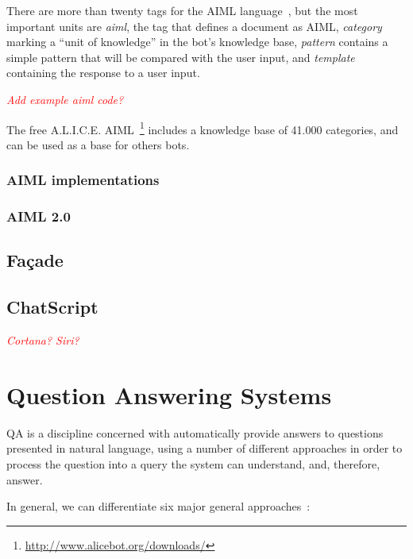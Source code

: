 There are more than twenty tags for the AIML language~\cite{aliceaiml}, but the most important units are \emph{aiml}, the tag that defines a document as \ac{AIML}, \emph{category} marking a ``unit of knowledge'' in the bot's knowledge base, \emph{pattern} contains a simple pattern that will be compared with the user input, and \emph{template} containing the response to a user input.

\emph{\textcolor{red}{Add example aiml code?}}

The free A.L.I.C.E. \ac{AIML}~\footnote{\url{http://www.alicebot.org/downloads/}} includes a knowledge base of 41.000 categories, and can be used as a base for others bots.

\subsubsection{\ac{AIML} implementations}

\subsubsection{\ac{AIML} 2.0}

\subsection{Façade}

\subsection{ChatScript}

\emph{\textcolor{red}{Cortana? Siri?}}

\section{Question Answering Systems}
\label{sec:qa_sys}

\ac{QA} is a discipline concerned with automatically provide answers to questions presented in natural language, using a number of different approaches in order to process the question into a query the system can understand, and, therefore, answer.

In general, we can differentiate six major general approaches~\cite{unger2014an}:

